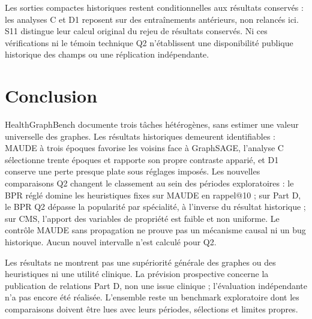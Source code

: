 Les sorties compactes historiques restent conditionnelles aux résultats conservés : les analyses C et D1 reposent sur des entraînements antérieurs, non relancés ici. S11 distingue leur calcul original du rejeu de résultats conservés. Ni ces vérifications ni le témoin technique Q2 n'établissent une disponibilité publique historique des champs ou une réplication indépendante.

\section{Conclusion}

HealthGraphBench documente trois tâches hétérogènes, sans estimer une valeur universelle des graphes. Les résultats historiques demeurent identifiables : MAUDE à trois époques favorise les voisins face à GraphSAGE, l'analyse C sélectionne trente époques et rapporte son propre contraste apparié, et D1 conserve une perte presque plate sous réglages imposés. Les nouvelles comparaisons Q2 changent le classement au sein des périodes exploratoires : le BPR réglé domine les heuristiques fixes sur MAUDE en rappel@10 ; sur Part D, le BPR Q2 dépasse la popularité par spécialité, à l'inverse du résultat historique ; sur CMS, l'apport des variables de propriété est faible et non uniforme. Le contrôle MAUDE sans propagation ne prouve pas un mécanisme causal ni un bug historique. Aucun nouvel intervalle n'est calculé pour Q2.

Les résultats ne montrent pas une supériorité générale des graphes ou des heuristiques ni une utilité clinique. La prévision prospective concerne la publication de relations Part D, non une issue clinique ; l'évaluation indépendante n'a pas encore été réalisée. L'ensemble reste un benchmark exploratoire dont les comparaisons doivent être lues avec leurs périodes, sélections et limites propres.
